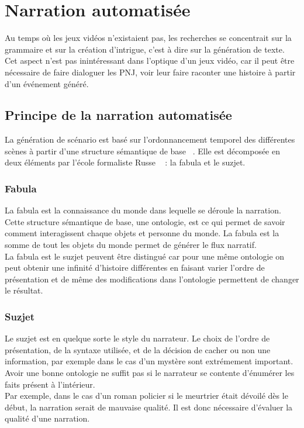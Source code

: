 \documentclass[asi]{picINSA}
\begin{document}
\chapter{Narration automatisée}

Au temps où les jeux vidéos n'existaient pas, les recherches se concentrait sur la grammaire et sur la création d'intrigue, c'est à dire sur la génération de texte. Cet aspect n'est pas inintéressant dans l'optique d'un jeux vidéo, car il peut être nécessaire de faire dialoguer les PNJ, voir leur faire raconter une histoire à partir d'un événement généré.


\section{Principe de la narration automatisée}

La génération de scénario est basé sur l'ordonnancement temporel des différentes scènes à partir d'une structure sémantique de base ~\cite{cavazza2002character}. Elle est décomposée en deux éléments par l'école formaliste Russe ~\cite{Callaway2002213} : la fabula et le suzjet. 

\subsection{Fabula}

La fabula est la connaissance du monde dans lequelle se déroule la narration. Cette structure sémantique de base, une ontologie, est ce qui permet de savoir comment interagissent chaque objets et personne du monde. La fabula est la somme de tout les objets du monde permet de générer le flux narratif. \\

La fabula est le suzjet peuvent être distingué car pour une même ontologie on peut obtenir une infinité d'histoire différentes en faisant varier l'ordre de présentation et de même des modifications dans l'ontologie permettent de changer le résultat.

\subsection{Suzjet}

Le suzjet est en quelque sorte le style du narrateur. Le choix de l'ordre de présentation, de la syntaxe utilisée, et de la décision de cacher ou non une information, par exemple dans le cas d'un mystère sont extrémement important. Avoir une bonne ontologie ne suffit pas si le narrateur se contente d'énumérer les faits présent à l'intérieur. \\
Par exemple, dans le cas d'un roman policier si le meurtrier était dévoilé dès le début, la narration serait de mauvaise qualité. Il est donc nécessaire d'évaluer la qualité d'une narration.
\end{document}
